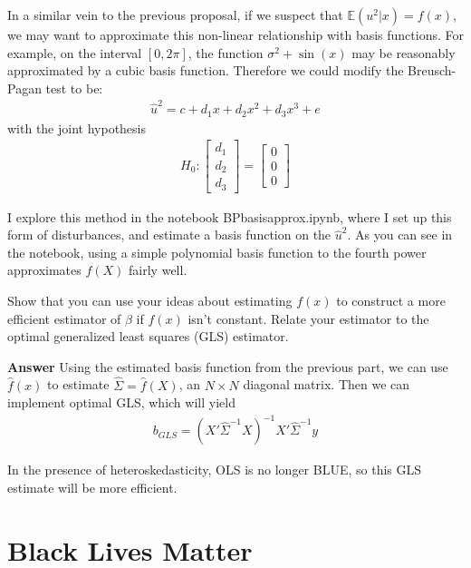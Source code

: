 \documentclass[11pt]{exam}
\begin{document}
\begin{questions}
In a similar vein to the previous proposal, if we suspect that
\(\mathbb{E}(u^2|x) = f(x)\), we may want to approximate this non-linear
relationship with basis functions. For example, on the interval
\([0, 2\pi]\), the function \(\sigma^2 + \sin(x)\) may be reasonably
approximated by a cubic basis function. Therefore we could modify the
Breusch-Pagan test to be:
\begin{align*}\hat{u}^2 = c + d_1x + d_2x^2 + d_3x^3 + e\end{align*}
with the joint hypothesis
\begin{align*}H_0: \begin{bmatrix} d_1 \\ d_2 \\ d_3 \end{bmatrix} = \begin{bmatrix} 0 \\ 0\\ 0 \end{bmatrix}\end{align*}

I explore this method in the notebook BP\textunderscore basis\textunderscore approx.ipynb, where I set up this form of disturbances, and estimate a basis function on the $\hat{u}^2$. As you can see in the notebook, using a simple polynomial basis function to the fourth power approximates $f(X)$ fairly well.

    \question Show that you can use your ideas about estimating \(f(x)\)
to construct a more efficient estimator of \(\beta\) if \(f(x)\) isn't
constant. Relate your estimator to the optimal generalized least squares
(GLS) estimator.

\textbf{Answer} Using the estimated basis function from the previous part, we can use $\hat{f}(x)$ to estimate $\hat{\Sigma} = \hat{f}(X)$, an $N\times N$ diagonal matrix. Then we can implement optimal GLS, which will yield
\begin{align*}
b_{GLS} = (X'\hat{\Sigma}^{-1}X)^{-1}X'\hat{\Sigma}^{-1}y
\end{align*}

In the presence of heteroskedasticity, OLS is no longer BLUE, so this GLS estimate will be more efficient. 


\end{questions}

    \hypertarget{black-lives-matter}{%
\section{Black Lives Matter}\label{black-lives-matter}}
\end{document}
